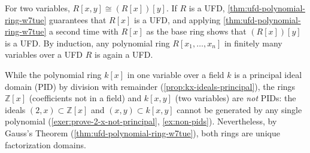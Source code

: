 \begin{content}

\begin{steps}
For two variables, $R[x, y] \cong (R[x])[y]$. If $R$ is a UFD, \cref{thm:ufd-polynomial-ring-w7tue} guarantees that $R[x]$ is a UFD, and applying \cref{thm:ufd-polynomial-ring-w7tue} a second time with $R[x]$ as the base ring shows that $(R[x])[y]$ is a UFD. By induction, any polynomial ring $R[x_1, \dots, x_n]$ in finitely many variables over a UFD $R$ is again a UFD.
\end{steps}
\end{content}

\begin{aiNote}
While the polynomial ring $k[x]$ in one variable over a field $k$ is a principal ideal domain (PID) by division with remainder (\cref{prop:kx-ideals-principal}), the rings $\mathbb{Z}[x]$ (coefficients not in a field) and $k[x, y]$ (two variables) are \emph{not} PIDs: the ideals $(2, x) \subset \mathbb{Z}[x]$ and $(x, y) \subset k[x, y]$ cannot be generated by any single polynomial (\cref{exer:prove-2-x-not-principal}, \cref{ex:non-pids}). Nevertheless, by Gauss's Theorem (\cref{thm:ufd-polynomial-ring-w7tue}), both rings are unique factorization domains.
\end{aiNote}

